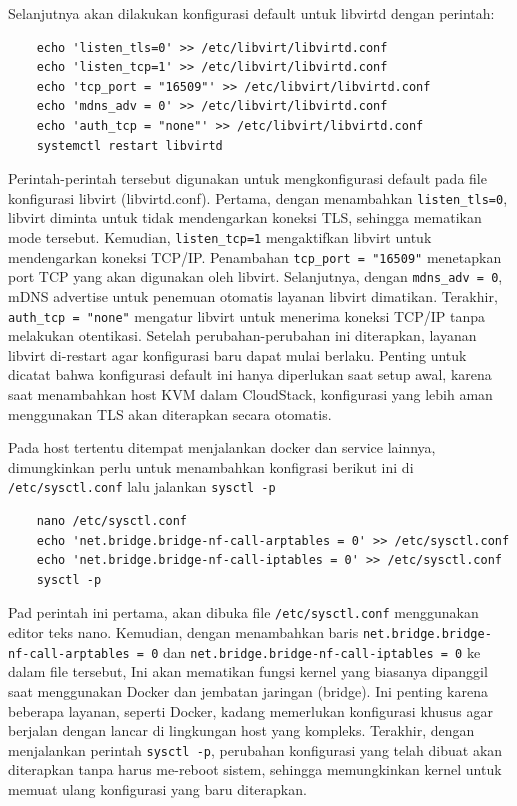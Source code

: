 Selanjutnya akan dilakukan konfigurasi default untuk libvirtd dengan perintah:

\begin{listing}[H]
    \begin{verbatim}
    echo 'listen_tls=0' >> /etc/libvirt/libvirtd.conf
    echo 'listen_tcp=1' >> /etc/libvirt/libvirtd.conf
    echo 'tcp_port = "16509"' >> /etc/libvirt/libvirtd.conf
    echo 'mdns_adv = 0' >> /etc/libvirt/libvirtd.conf
    echo 'auth_tcp = "none"' >> /etc/libvirt/libvirtd.conf
    systemctl restart libvirtd
    \end{verbatim}
\end{listing}

Perintah-perintah tersebut digunakan untuk mengkonfigurasi default pada file konfigurasi libvirt (libvirtd.conf). Pertama, dengan menambahkan \texttt{listen\_tls=0}, libvirt diminta untuk tidak mendengarkan koneksi TLS, sehingga mematikan mode tersebut. Kemudian, \texttt{listen\_tcp=1} mengaktifkan libvirt untuk mendengarkan koneksi TCP/IP. Penambahan \texttt{tcp\_port = "16509"} menetapkan port TCP yang akan digunakan oleh libvirt. Selanjutnya, dengan \texttt{mdns\_adv = 0}, mDNS advertise untuk penemuan otomatis layanan libvirt dimatikan. Terakhir, \texttt{auth\_tcp = "none"} mengatur libvirt untuk menerima koneksi TCP/IP tanpa melakukan otentikasi. Setelah perubahan-perubahan ini diterapkan, layanan libvirt di-restart agar konfigurasi baru dapat mulai berlaku. Penting untuk dicatat bahwa konfigurasi default ini hanya diperlukan saat setup awal, karena saat menambahkan host KVM dalam CloudStack, konfigurasi yang lebih aman menggunakan TLS akan diterapkan secara otomatis.

Pada host tertentu ditempat menjalankan docker dan service lainnya, dimungkinkan perlu untuk menambahkan konfigrasi berikut ini di \texttt{/etc/sysctl.conf} lalu jalankan \texttt{sysctl -p}

\begin{listing}[H]
    \begin{verbatim}
    nano /etc/sysctl.conf
    echo 'net.bridge.bridge-nf-call-arptables = 0' >> /etc/sysctl.conf
    echo 'net.bridge.bridge-nf-call-iptables = 0' >> /etc/sysctl.conf
    sysctl -p
    \end{verbatim}
\end{listing}

Pad perintah ini pertama, akan dibuka file \texttt{/etc/sysctl.conf} menggunakan editor teks nano. Kemudian, dengan menambahkan baris \texttt{net.bridge.bridge-nf-call-arptables = 0} dan \texttt{net.bridge.bridge-nf-call-iptables = 0} ke dalam file tersebut, Ini akan mematikan fungsi kernel yang biasanya dipanggil saat menggunakan Docker dan jembatan jaringan (bridge). Ini penting karena beberapa layanan, seperti Docker, kadang memerlukan konfigurasi khusus agar berjalan dengan lancar di lingkungan host yang kompleks. Terakhir, dengan menjalankan perintah \texttt{sysctl -p}, perubahan konfigurasi yang telah dibuat akan diterapkan tanpa harus me-reboot sistem, sehingga memungkinkan kernel untuk memuat ulang konfigurasi yang baru diterapkan.

